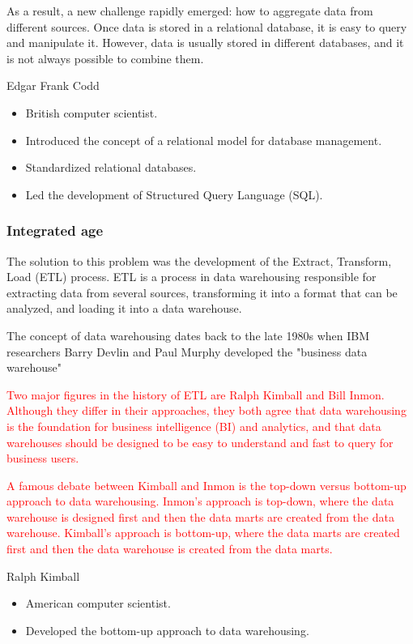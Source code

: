 As a result, a new challenge rapidly emerged: how to aggregate data from different
sources. Once data is stored in a relational database, it is easy to query and manipulate
it. However, data is usually stored in different databases, and it is not always possible
to combine them.

\begin{mainbox}{Edgar Frank Codd}
  \begin{itemize}
    \item British computer scientist.
    \item Introduced the concept of a relational model for database management.
    \item Standardized relational databases.
    \item Led the development of Structured Query Language (SQL).
  \end{itemize}
\end{mainbox}

\subsubsection{Integrated age}

The solution to this problem was the development of the Extract, Transform, Load (ETL)
process.  ETL is a process in data warehousing responsible for extracting data from
several sources, transforming it into a format that can be analyzed, and loading it into a
data warehouse.

The concept of data warehousing dates back to the late 1980s when IBM researchers Barry
Devlin and Paul Murphy developed the "business data warehouse"

\textcolor{red}{
Two major figures in the history of ETL are Ralph Kimball and Bill Inmon.  Although they
differ in their approaches, they both agree that data warehousing is the foundation for
business intelligence (BI) and analytics, and that data warehouses should be designed to
be easy to understand and fast to query for business users.
}

\textcolor{red}{
A famous debate between Kimball and Inmon is the top-down versus bottom-up approach to
data warehousing.  Inmon's approach is top-down, where the data warehouse is designed
first and then the data marts are created from the data warehouse.  Kimball's approach is
bottom-up, where the data marts are created first and then the data warehouse is created
from the data marts.
}

\begin{mainbox}{Ralph Kimball}
  \begin{itemize}
    \item American computer scientist.
    \item Developed the bottom-up approach to data warehousing.
  \end{itemize}
\end{mainbox}

